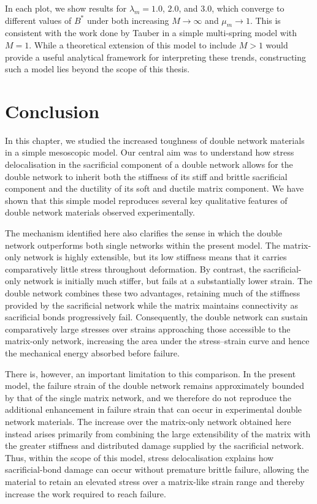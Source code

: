 In each plot, we show results for $\lambda_m=1.0$, $2.0$, and $3.0$, which converge to different values of $B^*$ under both increasing $M \to \infty$ and $\mu_m \to 1$. This is consistent with the work done by Tauber \etal \cite{tauber_microscopic_2020} in a simple multi-spring model with $M=1$. While a theoretical extension of this model to include $M > 1$ would provide a useful analytical framework for interpreting these trends, constructing such a model lies beyond the scope of this thesis. 

\section{Conclusion}
In this chapter, we studied the increased toughness of double network materials in a simple mesoscopic model. Our central aim was to understand how stress delocalisation in the sacrificial component of a double network allows for the double network to inherit both the stiffness of its stiff and brittle sacrificial component and the ductility of its soft and ductile matrix component. We have shown that this simple model reproduces several key qualitative features of double network materials observed experimentally.

The mechanism identified here also clarifies the sense in which the double network outperforms both single networks within the present model. The matrix-only network is highly extensible, but its low stiffness means that it carries comparatively little stress throughout deformation. By contrast, the sacrificial-only network is initially much stiffer, but fails at a substantially lower strain. The double network combines these two advantages, retaining much of the stiffness provided by the sacrificial network while the matrix maintains connectivity as sacrificial bonds progressively fail. Consequently, the double network can sustain comparatively large stresses over strains approaching those accessible to the matrix-only network, increasing the area under the stress--strain curve and hence the mechanical energy absorbed before failure.

There is, however, an important limitation to this comparison. In the present model, the failure strain of the double network remains approximately bounded by that of the single matrix network, and we therefore do not reproduce the additional enhancement in failure strain that can occur in experimental double network materials. The increase over the matrix-only network obtained here instead arises primarily from combining the large extensibility of the matrix with the greater stiffness and distributed damage supplied by the sacrificial network. Thus, within the scope of this model, stress delocalisation explains how sacrificial-bond damage can occur without premature brittle failure, allowing the material to retain an elevated stress over a matrix-like strain range and thereby increase the work required to reach failure.

